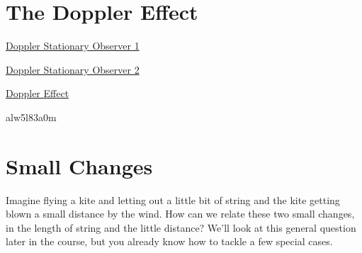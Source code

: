 \documentclass{ximera}
\begin{document}
\section*{The Doppler Effect}

\begin{onlineOnly}
    \begin{center}
\end{center}
\end{onlineOnly}

\href{https://www.desmos.com/calculator/zk06s3k6q4}{Doppler Stationary Observer 1}


\begin{onlineOnly}
    \begin{center}
\end{center}
\end{onlineOnly}

\href{https://www.desmos.com/calculator/sviyndbyt9}{Doppler Stationary Observer 2}




\begin{onlineOnly}
    \begin{center}
\end{center}
\end{onlineOnly}

\href{https://www.desmos.com/calculator/alw5l83a0m}{Doppler Effect}


alw5l83a0m


\section*{Small Changes}
Imagine flying a kite and letting out a little bit of string and the kite getting blown a small distance by the wind. How can we relate these two small changes, in the length of string and the little distance? We'll look at this general question later in the course, but you already know how to tackle a few special cases.
\end{document}
